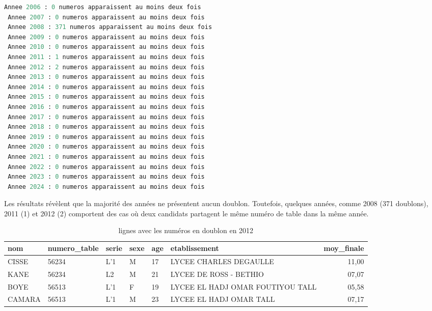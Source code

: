 \newpage
\begin{lstlisting}[language=Python,
    caption=Nombre de numero\_table en doublon par année,
    label=lst:doublons,
    basicstyle=\ttfamily\small,
    backgroundcolor=\color{gray!10}
]
 Annee 2006 : 0 numeros apparaissent au moins deux fois
 Annee 2007 : 0 numeros apparaissent au moins deux fois
 Annee 2008 : 371 numeros apparaissent au moins deux fois
 Annee 2009 : 0 numeros apparaissent au moins deux fois
 Annee 2010 : 0 numeros apparaissent au moins deux fois
 Annee 2011 : 1 numeros apparaissent au moins deux fois
 Annee 2012 : 2 numeros apparaissent au moins deux fois
 Annee 2013 : 0 numeros apparaissent au moins deux fois
 Annee 2014 : 0 numeros apparaissent au moins deux fois
 Annee 2015 : 0 numeros apparaissent au moins deux fois
 Annee 2016 : 0 numeros apparaissent au moins deux fois
 Annee 2017 : 0 numeros apparaissent au moins deux fois
 Annee 2018 : 0 numeros apparaissent au moins deux fois
 Annee 2019 : 0 numeros apparaissent au moins deux fois
 Annee 2020 : 0 numeros apparaissent au moins deux fois
 Annee 2021 : 0 numeros apparaissent au moins deux fois
 Annee 2022 : 0 numeros apparaissent au moins deux fois
 Annee 2023 : 0 numeros apparaissent au moins deux fois
 Annee 2024 : 0 numeros apparaissent au moins deux fois 
\end{lstlisting}

Les résultats révèlent que la majorité des années ne présentent aucun doublon. 
Toutefois, quelques années, comme 2008 (371 doublons), 2011 (1) et 2012 (2) comportent des cas où deux candidats partagent le même numéro de table dans la même année.

\begin{table}[ht]
\scriptsize
\centering
\caption{lignes avec les numéros en doublon en 2012}
\label{tab:doublon}
\begin{tabular}{llllllr}
\toprule
nom & numero\_table & serie & sexe & age & etablissement & moy\_finale \\
\midrule
CISSE & 56234 & L'1 & M & 17 & LYCEE CHARLES DEGAULLE & 11,00 \\
KANE & 56234 & L2 & M & 21 & LYCEE DE ROSS - BETHIO & 07,07 \\
BOYE & 56513 & L'1 & F & 19 & LYCEE EL HADJ OMAR FOUTIYOU TALL & 05,58 \\
CAMARA & 56513 & L'1 & M & 23 & LYCEE EL HADJ OMAR TALL & 07,17 \\
\bottomrule
\end{tabular}
\end{table}


